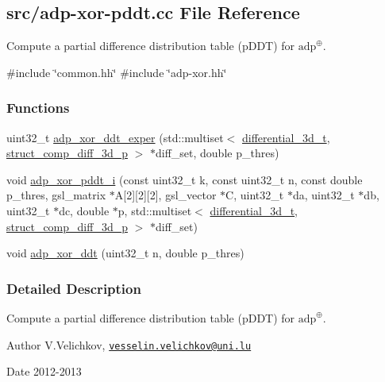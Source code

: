\hypertarget{adp-xor-pddt_8cc}{\subsection{src/adp-\/xor-\/pddt.cc \-File \-Reference}
\label{adp-xor-pddt_8cc}
}


\-Compute a partial difference distribution table (p\-D\-D\-T) for $\mathrm{adp}^{\oplus}$.  


{\ttfamily \#include \char`\"{}common.\-hh\char`\"{}}\*
{\ttfamily \#include \char`\"{}adp-\/xor.\-hh\char`\"{}}\*
\subsubsection*{\-Functions}
\begin{DoxyCompactItemize}
\item 
uint32\-\_\-t \hyperlink{adp-xor-pddt_8cc_ae336b477810714f22775c1c36449c3a8}{adp\-\_\-xor\-\_\-ddt\-\_\-exper} (std\-::multiset$<$ \hyperlink{structdifferential__3d__t}{differential\-\_\-3d\-\_\-t}, \hyperlink{structstruct__comp__diff__3d__p}{struct\-\_\-comp\-\_\-diff\-\_\-3d\-\_\-p} $>$ $\ast$diff\-\_\-set, double p\-\_\-thres)
\item 
void \hyperlink{adp-xor-pddt_8cc_a390612775ec87908fbb044d375ff9010}{adp\-\_\-xor\-\_\-pddt\-\_\-i} (const uint32\-\_\-t k, const uint32\-\_\-t n, const double p\-\_\-thres, gsl\-\_\-matrix $\ast$\-A\mbox{[}2\mbox{]}\mbox{[}2\mbox{]}\mbox{[}2\mbox{]}, gsl\-\_\-vector $\ast$\-C, uint32\-\_\-t $\ast$da, uint32\-\_\-t $\ast$db, uint32\-\_\-t $\ast$dc, double $\ast$p, std\-::multiset$<$ \hyperlink{structdifferential__3d__t}{differential\-\_\-3d\-\_\-t}, \hyperlink{structstruct__comp__diff__3d__p}{struct\-\_\-comp\-\_\-diff\-\_\-3d\-\_\-p} $>$ $\ast$diff\-\_\-set)
\item 
void \hyperlink{adp-xor-pddt_8cc_a2a98c59498fcf33df1976b272cf5809e}{adp\-\_\-xor\-\_\-ddt} (uint32\-\_\-t n, double p\-\_\-thres)
\end{DoxyCompactItemize}


\subsubsection{\-Detailed \-Description}
\-Compute a partial difference distribution table (p\-D\-D\-T) for $\mathrm{adp}^{\oplus}$. \begin{DoxyAuthor}{\-Author}
\-V.\-Velichkov, \href{mailto:vesselin.velichkov@uni.lu}{\tt vesselin.\-velichkov@uni.\-lu} 
\end{DoxyAuthor}
\begin{DoxyDate}{\-Date}
2012-\/2013 
\end{DoxyDate}


